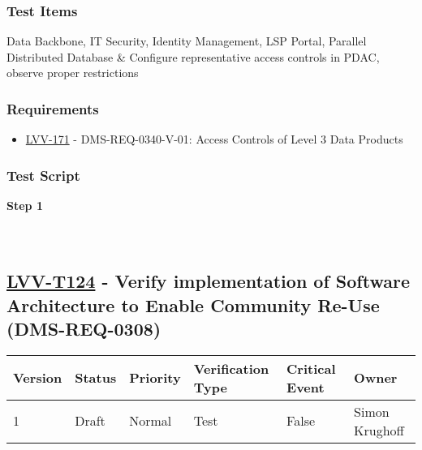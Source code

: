 \hypertarget{test-items-99}{%
\subsubsection{Test Items}\label{test-items-99}}

Data Backbone, IT Security, Identity Management, LSP Portal, Parallel
Distributed Database \& Configure representative access controls in
PDAC, observe proper restrictions

\hypertarget{requirements-100}{%
\subsubsection{Requirements}\label{requirements-100}}

\begin{itemize}
\tightlist
\item
  \href{https://jira.lsstcorp.org/browse/LVV-171}{LVV-171} -
  DMS-REQ-0340-V-01: Access Controls of Level 3 Data Products
\end{itemize}

\hypertarget{test-script-100}{%
\subsubsection{Test Script}\label{test-script-100}}

\textbf{Step 1}\\
~\\
~\\

\hypertarget{lvv-t124---verify-implementation-of-software-architecture-to-enable-community-re-use-dms-req-0308}{%
\subsection{\texorpdfstring{\href{https://jira.lsstcorp.org/secure/Tests.jspa\#/testCase/LVV-T124}{LVV-T124}
- Verify implementation of Software Architecture to Enable Community
Re-Use
(DMS-REQ-0308)}{LVV-T124 - Verify implementation of Software Architecture to Enable Community Re-Use (DMS-REQ-0308)}}\label{lvv-t124---verify-implementation-of-software-architecture-to-enable-community-re-use-dms-req-0308}}

\begin{longtable}[]{@{}llllll@{}}
\toprule
Version & Status & Priority & Verification Type & Critical Event &
Owner\tabularnewline
\midrule
\endhead
1 & Draft & Normal & Test & False & Simon Krughoff\tabularnewline
\bottomrule
\end{longtable}

